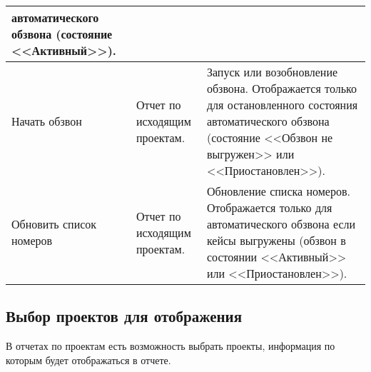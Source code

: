 \begin{small}
\begin{longtable}{|p{}|p{}|p{}|}
    автоматического обзвона (состояние <<Активный>>).\\
    \hline
    Начать обзвон &
    Отчет по исходящим проектам. &
    Запуск или возобновление обзвона.
    Отображается только для остановленного состояния
    автоматического обзвона (состояние <<Обзвон не выгружен>> или
    <<Приостановлен>>).\\
    \hline
    Обновить список номеров &
    Отчет по исходящим проектам. &
    Обновление списка номеров.
    Отображается только для автоматического обзвона
    если кейсы выгружены (обзвон в состоянии <<Активный>> или <<Приостановлен>>).\\
\end{longtable}
\end{small}


\subsection{Выбор проектов для отображения}
\label{subsec:выбор-проектов-для-отображения}

В отчетах по проектам есть возможность выбрать проекты, информация по которым будет отображаться в отчете.

